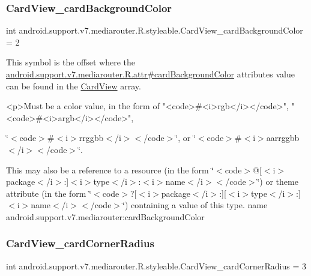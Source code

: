 \subsubsection{\texorpdfstring{Card\+View\+\_\+card\+Background\+Color}{CardView\_cardBackgroundColor}}
{\footnotesize\ttfamily int android.\+support.\+v7.\+mediarouter.\+R.\+styleable.\+Card\+View\+\_\+card\+Background\+Color = 2\hspace{0.3cm}{\ttfamily [static]}}

This symbol is the offset where the \hyperlink{classandroid_1_1support_1_1v7_1_1mediarouter_1_1R_1_1attr_a03e2dd68efbbc61b11e0d2c98f2c95ab}{android.\+support.\+v7.\+mediarouter.\+R.\+attr\#card\+Background\+Color} attribute\textquotesingle{}s value can be found in the \hyperlink{classandroid_1_1support_1_1v7_1_1mediarouter_1_1R_1_1styleable_a58720bc744e6374c25e81b8ae15a2c6a}{Card\+View} array.

\begin{DoxyVerb}      <p>Must be a color value, in the form of "<code>#<i>rgb</i></code>", "<code>#<i>argb</i></code>",
\end{DoxyVerb}
 \char`\"{}$<$code$>$\#$<$i$>$rrggbb$<$/i$>$$<$/code$>$\char`\"{}, or \char`\"{}$<$code$>$\#$<$i$>$aarrggbb$<$/i$>$$<$/code$>$\char`\"{}. 

This may also be a reference to a resource (in the form \char`\"{}$<$code$>$@\mbox{[}$<$i$>$package$<$/i$>$\+:\mbox{]}$<$i$>$type$<$/i$>$\+:$<$i$>$name$<$/i$>$$<$/code$>$\char`\"{}) or theme attribute (in the form \char`\"{}$<$code$>$?\mbox{[}$<$i$>$package$<$/i$>$\+:\mbox{]}\mbox{[}$<$i$>$type$<$/i$>$\+:\mbox{]}$<$i$>$name$<$/i$>$$<$/code$>$\char`\"{}) containing a value of this type.  name android.\+support.\+v7.\+mediarouter\+:card\+Background\+Color \mbox{\label{classandroid_1_1support_1_1v7_1_1mediarouter_1_1R_1_1styleable_a548412d8d96cee090ee611a2476521d0}} 
\subsubsection{\texorpdfstring{Card\+View\+\_\+card\+Corner\+Radius}{CardView\_cardCornerRadius}}
{\footnotesize\ttfamily int android.\+support.\+v7.\+mediarouter.\+R.\+styleable.\+Card\+View\+\_\+card\+Corner\+Radius = 3\hspace{0.3cm}{\ttfamily [static]}}

